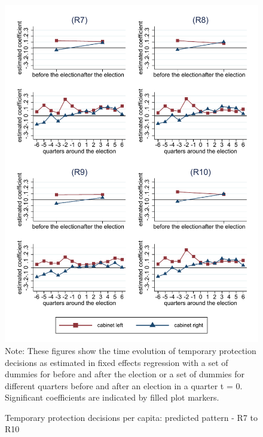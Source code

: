 \documentclass[11pt,a4paper]{scrartcl}
\begin{document}
\clearpage
\FloatBarrier
\begin{figure}[!ht]
	\caption{Temporary protection decisions per capita: predicted pattern - R7 to R10}
	\includegraphics[width=1\textwidth]{../results/decisions/log_temporary_protection_pc_graphs_R7-R10.pdf}
	\scriptsize{Note: These figures show the time evolution of temporary protection decisions as estimated in fixed effects regression with a set of dummies for before and after the election or a set of dummies for different quarters before and after an election in a quarter t = 0. Significant coefficients are indicated by filled plot markers.}
\end{figure}




\clearpage
\FloatBarrier

\end{document}
